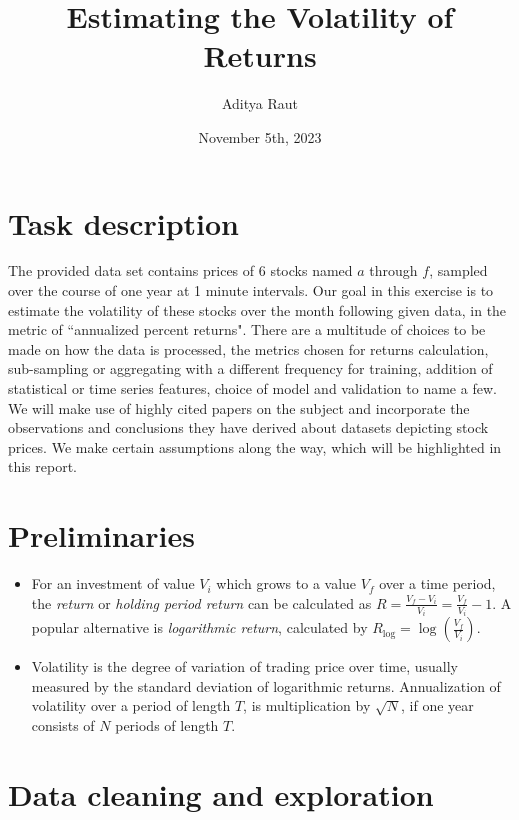 \documentclass{article}
\title{\vspace{-50pt} Estimating the Volatility of Returns}
\author{Aditya Raut}
\date{November 5th, 2023}
\begin{document}
	
\maketitle
\tableofcontents

\section{Task description}
The provided data set contains prices of $6$ stocks named $a$ through $f$, sampled over the course of one year at 1 minute intervals. Our goal in this exercise is to estimate the volatility of these stocks over the month following given data, in the metric of ``annualized percent returns". There are a multitude of choices to be made on how the data is processed, the metrics chosen for returns calculation, sub-sampling or aggregating with a different frequency for training, addition of statistical or time series features, choice of model and validation to name a few. We will make use of highly cited papers on the subject and incorporate the observations and conclusions they have derived about datasets depicting stock prices. We make certain assumptions along the way, which will be highlighted in this report.

\section{Preliminaries}

\begin{itemize}
	\item For an investment of value $V_i$ which grows to a value $V_f$ over a time period, the \textit{return} or \textit{holding period return} can be calculated as $R = \frac{V_f-V_i}{V_i} = \frac{V_f}{V_i}-1$. A popular alternative is \textit{logarithmic return}, calculated by $R_\text{log} = \log\left(\frac{V_f}{V_i}\right)$.\cite{enwiki:1178339248}
	\item Volatility is the degree of variation of trading price over time, usually measured by the standard deviation of logarithmic returns. Annualization of volatility over a period of length $T$, is multiplication by $\sqrt{N}$, if one year consists of $N$ periods of length $T$. \cite{enwiki:1182638071}
\end{itemize}

\section{Data cleaning and exploration}
\end{document}
